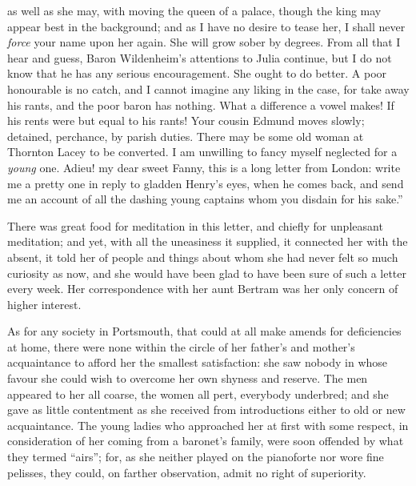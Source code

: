 \documentclass{article}
\begin{document}
as well as she may, with moving the queen of a palace,
though the king may appear best in the background;
and as I have no desire to tease her, I shall never \emph{force}
your name upon her again.  She will grow sober by degrees.
From all that I hear and guess, Baron Wildenheim's
attentions to Julia continue, but I do not know that he
has any serious encouragement.  She ought to do better.
A poor honourable is no catch, and I cannot imagine any
liking in the case, for take away his rants, and the poor
baron has nothing.  What a difference a vowel makes!
If his rents were but equal to his rants!  Your cousin
Edmund moves slowly; detained, perchance, by parish duties.
There may be some old woman at Thornton Lacey to be converted.
I am unwilling to fancy myself neglected for a \emph{young} one.
Adieu! my dear sweet Fanny, this is a long letter from London:
write me a pretty one in reply to gladden Henry's eyes,
when he comes back, and send me an account of all the dashing
young captains whom you disdain for his sake.''

There was great food for meditation in this letter,
and chiefly for unpleasant meditation; and yet, with all
the uneasiness it supplied, it connected her with the absent,
it told her of people and things about whom she had never
felt so much curiosity as now, and she would have been
glad to have been sure of such a letter every week.
Her correspondence with her aunt Bertram was her only
concern of higher interest.

As for any society in Portsmouth, that could at all make
amends for deficiencies at home, there were none within
the circle of her father's and mother's acquaintance
to afford her the smallest satisfaction:  she saw nobody
in whose favour she could wish to overcome her own
shyness and reserve.  The men appeared to her all coarse,
the women all pert, everybody underbred; and she gave
as little contentment as she received from introductions
either to old or new acquaintance.  The young ladies who
approached her at first with some respect, in consideration
of her coming from a baronet's family, were soon offended
by what they termed ``airs''; for, as she neither played
on the pianoforte nor wore fine pelisses, they could,
on farther observation, admit no right of superiority.
\end{document}
